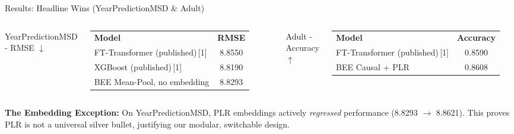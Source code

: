 \documentclass[aspectratio=169, xcolor=table]{beamer}
\begin{document}
\begin{frame}{Results: Headline Wins (YearPredictionMSD \& Adult)}
    \begin{columns}[t]
        \centering
        \large YearPredictionMSD - RMSE $\downarrow$ \\[0.3cm]
        \small
        \renewcommand{\arraystretch}{1.3}
        \begin{tabular}{l | c}
            \rowcolor{PrimaryColor} \color{white}\textbf{Model} & \color{white}\textbf{RMSE} \\
            FT-Transformer (published)\,{\scriptsize[1]} & 8.8550 \\
            XGBoost (published)\,{\scriptsize[1]} & 8.8190 \\
            \rowcolor{SecondaryColor} \color{white}BEE Mean-Pool, no embedding & \color{white}8.8293 \\
        \end{tabular}

        \centering
        \large Adult - Accuracy $\uparrow$ \\[0.3cm]
        \small
        \renewcommand{\arraystretch}{1.3}
        \begin{tabular}{l | c}
            \rowcolor{PrimaryColor} \color{white}\textbf{Model} & \color{white}\textbf{Accuracy} \\
            FT-Transformer (published)\,{\scriptsize[1]} & 0.8590 \\
            \rowcolor{SecondaryColor} \color{white}BEE Causal + PLR & \color{white}0.8608 \\
        \end{tabular}
    \end{columns}
    \vspace{0.6cm}
    \textbf{The Embedding Exception:} On YearPredictionMSD, PLR embeddings actively \textit{regressed}
    performance (8.8293 $\to$ 8.8621). This proves PLR is not a universal silver bullet, justifying our
    modular, switchable design.
\end{frame}
\end{document}
